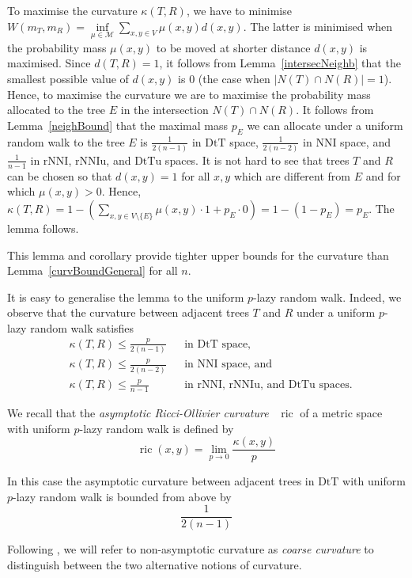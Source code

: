 \documentclass{amsart}
\newcommand{\nni}{\mathrm{NNI}}
\newcommand{\rnni}{\mathrm{rNNI}}
\newcommand{\rnniu}{\mathrm{rNNIu}}
\newcommand{\mdts}{\mathrm{DtT}}
\newcommand{\mdtsu}{\mathrm{DtTu}}
\newcommand{\ric}{\operatorname{ric}}
\newcommand{\M}{\mathcal{M}}
\begin{document}
\proof
To maximise the curvature $\kappa(T,R)$, we have to minimise $W(m_T,m_R) = \inf\limits_{\mu\in\M} \sum\limits_{x,y\in V}\mu(x,y) d(x,y)$.
The latter is minimised when the probability mass $\mu(x,y)$ to be moved at shorter distance $d(x,y)$ is maximised.
Since $d(T,R) = 1$, it follows from Lemma~\ref{intersecNeighb} that the smallest possible value of $d(x,y)$ is $0$ (the case when $|N(T) \cap N(R)| = 1$).
Hence, to maximise the curvature we are to maximise the probability mass allocated to the tree $E$ in the intersection $N(T) \cap N(R)$.
It follows from Lemma~\ref{neighBound} that the maximal mass $p_E$ we can allocate under a uniform random walk to the tree $E$ is $\frac{1}{2(n-1)}$ in $\mdts$ space, $\frac{1}{2(n-2)}$ in $\nni$ space, and $\frac{1}{n-1}$ in $\rnni$, $\rnniu$, and $\mdtsu$ spaces.
It is not hard to see that trees $T$ and $R$ can be chosen so that $d(x,y) = 1$ for all $x,y$ which are different from $E$ and for which $\mu(x,y) > 0$.
Hence, $\kappa(T, R) = 1 - \left(\sum\limits_{x,y\in V\setminus\{E\}}\mu(x,y)\cdot 1 + p_E \cdot 0\right) = 1 - (1-p_E) = p_E$.
The lemma follows.
\endproof

This lemma and corollary provide tighter upper bounds for the curvature than Lemma~\ref{curvBoundGeneral} for all $n$.

It is easy to generalise the lemma to the uniform $p$-lazy random walk.
Indeed, we observe that the curvature between adjacent trees $T$ and $R$ under a uniform $p$-lazy random walk satisfies
\begin{align*}
& \kappa(T,R) \leq \frac{p}{2(n-1)}	&& \mbox{in $\mdts$ space,}\\
& \kappa(T,R) \leq \frac{p}{2(n-2)}	&& \mbox{in $\nni$ space, and}\\
& \kappa(T,R) \leq \frac{p}{n-1}		&& \mbox{in $\rnni$, $\rnniu$, and $\mdtsu$ spaces.}
\end{align*}

We recall that the {\em asymptotic Ricci-Ollivier curvature}~\autocite{Loisel2014-gu} $\ric$ of a metric space with uniform $p$-lazy random walk is defined by
\[
\ric(x,y) = \lim_{p\to0} \frac{\kappa(x,y)}{p}
\]

In this case the asymptotic curvature between adjacent trees in $\mdts$ with uniform $p$-lazy random walk is bounded from above by
\[
\frac{1}{2(n-1)}
\]

Following \textcite{Loisel2014-gu}, we will refer to non-asymptotic curvature as {\em coarse curvature} to distinguish between the two alternative notions of curvature.
\end{document}

